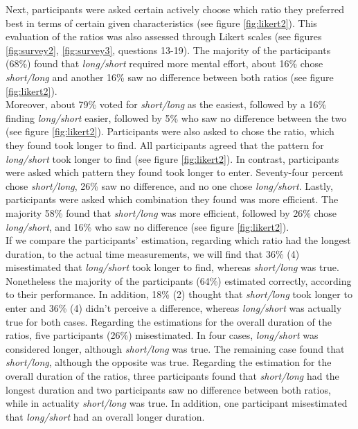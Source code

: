 Next, participants were asked certain actively choose which ratio they preferred best in terms of certain given characteristics (see figure \ref{fig:likert2}). This evaluation of the ratios was also assessed through Likert scales (see figures \ref{fig:survey2}, \ref{fig:survey3}, questions 13-19). The majority of the participants (68\%) found that \textit{long/short} required more mental effort, about 16\% chose \textit{short/long} and another 16\% saw no difference between both ratios (see figure \ref{fig:likert2}). \\
Moreover, about 79\% voted for \textit{short/long} as the easiest, followed by a 16\% finding \textit{long/short} easier, followed by 5\% who saw no difference between the two (see figure \ref{fig:likert2}). Participants were also asked to chose the ratio, which they found took longer to find. All participants agreed that the pattern for \textit{long/short} took longer to find (see figure \ref{fig:likert2}). In contrast, participants were asked which pattern they found took longer to enter. Seventy-four percent chose \textit{short/long}, 26\% saw no difference, and no one chose \textit{long/short}. Lastly, participants were asked which combination they found was more efficient. The majority 58\% found that \textit{short/long} was more efficient, followed by 26\% chose \textit{long/short}, and 16\% who saw no difference (see figure \ref{fig:likert2}). \\

If we compare the participants' estimation, regarding which ratio had the longest duration, to the actual time measurements, we will find that 36\% (4) misestimated that \textit{long/short} took longer to find, whereas \textit{short/long} was true. Nonetheless the majority of the participants (64\%) estimated correctly, according to their performance. In addition, 18\% (2) thought that \textit{short/long} took longer to enter and 36\% (4) didn't perceive a difference, whereas \textit{long/short} was actually true for both cases. Regarding the estimations for the overall duration of the ratios, five participants (26\%) misestimated. In four cases, \textit{long/short} was considered longer, although \textit{short/long} was true. The remaining case found that \textit{short/long}, although the opposite was true. Regarding the estimation for the overall duration of the ratios, three participants found that \textit{short/long} had the longest duration and two participants saw no difference between both ratios, while in actuality \textit{short/long} was true. In addition, one participant misestimated that \textit{long/short} had an overall longer duration.\\

